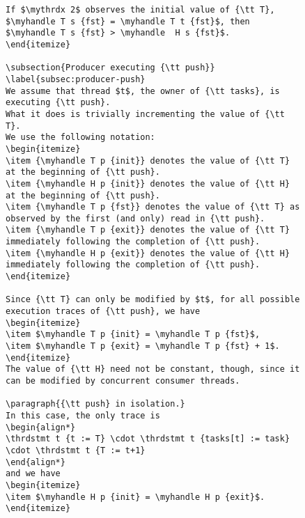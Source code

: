 \documentclass[a4paper]{article}
\begin{document}
{\begin{figure}
\begin{lstlisting}
If $\mythrdx 2$ observes the initial value of {\tt T}, $\myhandle T s {fst} = \myhandle T t {fst}$, then $\myhandle T s {fst} > \myhandle  H s {fst}$.
\end{itemize}

\subsection{Producer executing {\tt push}}
\label{subsec:producer-push}
We assume that thread $t$, the owner of {\tt tasks}, is executing {\tt push}.
What it does is trivially incrementing the value of {\tt T}. 
We use the following notation:
\begin{itemize}
\item {\myhandle T p {init}} denotes the value of {\tt T} at the beginning of {\tt push}.
\item {\myhandle H p {init}} denotes the value of {\tt H} at the beginning of {\tt push}.
\item {\myhandle T p {fst}} denotes the value of {\tt T} as observed by the first (and only) read in {\tt push}.
\item {\myhandle T p {exit}} denotes the value of {\tt T} immediately following the completion of {\tt push}.
\item {\myhandle H p {exit}} denotes the value of {\tt H} immediately following the completion of {\tt push}.
\end{itemize}

Since {\tt T} can only be modified by $t$, for all possible execution traces of {\tt push}, we have
\begin{itemize}
\item $\myhandle T p {init} = \myhandle T p {fst}$,
\item $\myhandle T p {exit} = \myhandle T p {fst} + 1$.
\end{itemize}
The value of {\tt H} need not be constant, though, since it can be modified by concurrent consumer threads.

\paragraph{{\tt push} in isolation.}
In this case, the only trace is 
\begin{align*}
\thrdstmt t {t := T} \cdot \thrdstmt t {tasks[t] := task} \cdot \thrdstmt t {T := t+1}
\end{align*}
and we have
\begin{itemize}
\item $\myhandle H p {init} = \myhandle H p {exit}$.
\end{itemize}


\end{lstlisting}
\end{figure}}
\end{document}
